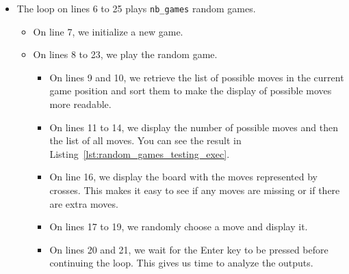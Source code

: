 \documentclass[12pt,a4paper,twoside,openright]{book}
\begin{document}
\begin{itemize}
\item The loop on lines 6 to 25 plays \texttt{nb_games} random games.
\begin{itemize}
\item On line 7, we initialize a new game.
\item On lines 8 to 23, we play the random game.
\begin{itemize}
\item On lines 9 and 10, we retrieve the list of possible moves in the current game position and sort them to make the display of possible moves more readable.
\item On lines 11 to 14, we display the number of possible moves and then the list of all moves. You can see the result in Listing~\ref{lst:random_games_testing_exec}.
\item On line 16, we display the board with the moves represented by crosses. This makes it easy to see if any moves are missing or if there are extra moves.
\item On lines 17 to 19, we randomly choose a move and display it.
\item On lines 20 and 21, we wait for the Enter key to be pressed before continuing the loop. This gives us time to analyze the outputs.

\end{itemize}

\end{itemize}

\end{itemize}
\end{document}
